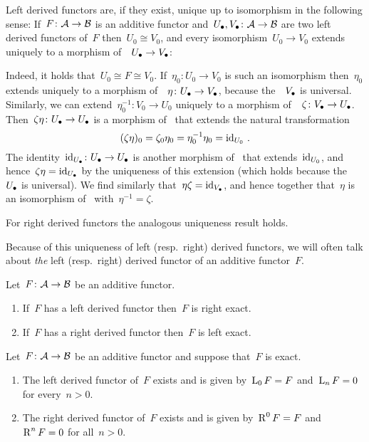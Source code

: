 \begin{remark}
  Left derived functors are, if they exist, unique up to isomorphism in the following sense:
  If~$F \colon \mathcal{A} \to \mathcal{B}$ is an additive functor and~$U_\bullet, V_\bullet \colon \mathcal{A} \to \mathcal{B}$ are two left derived functors of~$F$ then~$U_0 \cong V_0$, and every isomorphism~$U_0 \to V_0$ extends uniquely to a morphism of~{\deltafuns}~$U_\bullet \to V_\bullet$:
  
  Indeed, it holds that~$U_0 \cong F \cong V_0$.
  If~$\eta_0 \colon U_0 \to V_0$ is such an isomorphism then~$\eta_0$ extends uniquely to a morphism of~{\deltafuns}~$\eta \colon U_\bullet \to V_\bullet$, because the~{\deltafun}~$V_\bullet$ is universal.
  Similarly, we can extend~$\eta_0^{-1} \colon V_0 \to U_0$ uniquely to a morphism of~{\deltafuns}~$\zeta \colon V_\bullet \to U_\bullet$.
  Then~$\zeta \eta \colon U_\bullet \to U_\bullet$ is a morphism of~{\deltafuns} that extends the natural transformation
  \[
      (\zeta \eta)_0
    = \zeta_0 \eta_0
    = \eta_0^{-1} \eta_0
    = \operatorname{id}_{U_0} \,.
  \]
  The identity~$\operatorname{id}_{U_\bullet} \colon U_\bullet \to U_\bullet$ is another morphism of~{\deltafuns} that extends~$\operatorname{id}_{U_0}$, and hence~$\zeta \eta = \operatorname{id}_{U_\bullet}$ by the uniqueness of this extension (which holds because the~{\deltafun}~$U_\bullet$ is universal).
  We find similarly that~$\eta \zeta = \operatorname{id}_{V_\bullet}$, and hence together that~$\eta$ is an isomorphism of~{\deltafuns} with~$\eta^{-1} = \zeta$.
  
  For right derived functors the analogous uniqueness result holds.
\end{remark}


\begin{notation*}
  Because of this uniqueness of left (resp.\ right) derived functors, we will often talk about \emph{the} left (resp.\ right) derived functor of an additive functor~$F$.
\end{notation*}


\begin{remark}
  Let~$F \colon \mathcal{A} \to \mathcal{B}$ be an additive functor.
  \begin{enumerate}
    \item
      If~$F$ has a left derived functor then~$F$ is right exact.
    \item
      If~$F$ has a right derived functor then~$F$ is left exact.
  \end{enumerate}
\end{remark}


\begin{lemma}
  Let~$F \colon \mathcal{A} \to \mathcal{B}$ be an additive functor and suppose that~$F$ is exact.
  \begin{enumerate}
    \item
      \label{left derived for exact}
      The left derived functor of~$F$ exists and is given by~$\operatorname{L}_0 F = F$ and~$\operatorname{L}_n F = 0$ for every~$n > 0$.
    \item
      \label{right derived for exact}
      The right derived functor of~$F$ exists and is given by~$\operatorname{R}^0 F = F$ and~$\operatorname{R}^n F = 0$ for all~$n > 0$.
  \end{enumerate}
\end{lemma}


